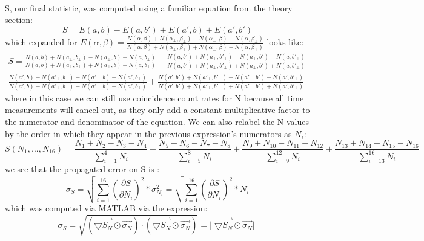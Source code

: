 \documentclass{article}
\begin{document}
    \\\indent S, our final statistic, was computed using a familiar equation from the theory section:
    \begin{equation}
        S = E(a,b) - E(a,b') + E(a',b) + E(a',b')
    \end{equation}
    which expanded for $E(\alpha,\beta) = \frac{N(\alpha,\beta) + N(\alpha_\bot,\beta_\bot) - N(\alpha_\bot,\beta) - N(\alpha,\beta_\bot)}{N(\alpha,\beta) + N(\alpha_\bot,\beta_\bot) + N(\alpha_\bot,\beta) + N(\alpha,\beta_\bot)}$ looks like:
    \begin{equation}
    \begin{array}{c}
        S = \frac{N(a,b) + N(a_\bot,b_\bot) - N(a_\bot,b) - N(a,b_\bot)}{N(a,b) + N(a_\bot,b_\bot) + N(a_\bot,b) + N(a,b_\bot)} - \frac{N(a,b') + N(a_\bot,b'_\bot) - N(a_\bot,b') - N(a,b'_\bot)}{N(a,b') + N(a_\bot,b'_\bot) + N(a_\bot,b') + N(a,b'_\bot)} + \\\frac{N(a',b) + N(a'_\bot,b_\bot) - N(a'_\bot,b) - N(a',b_\bot)}{N(a',b) + N(a'_\bot,b_\bot) + N(a'_\bot,b) + N(a',b_\bot)} + \frac{N(a',b') + N(a'_\bot,b'_\bot) - N(a'_\bot,b') - N(a',b'_\bot)}{N(a',b') + N(a'_\bot,b'_\bot) + N(a'_\bot,b') + N(a',b'_\bot)}
        \end{array}
    \end{equation}
    where in this case we can still use coincidence count rates for N because all time measurements will cancel out, as they only add a constant multiplicative factor to the numerator and denominator of the equation. We can also relabel the N-values by the order in which they appear in the previous expression's numerators as $N_i$:
    \begin{equation}
        S(N_1,...,N_{16}) = \frac{N_1 + N_2 - N_3 - N_4}{\sum_{i=1}^4 N_i} -\frac{N_5 + N_6 - N_7 - N_8}{\sum_{i=5}^8 N_i}  +\frac{N_9 + N_{10} - N_{11} - N_{12}}{\sum_{i=9}^{12} N_i} +\frac{N_{13} + N_{14} - N_{15} - N_{16}}{\sum_{i=13}^{16} N_i} 
    \end{equation}
    we see that the propagated error on S is \cite{deh}:
    \begin{equation}
        \sigma_S = \sqrt{\sum_{i=1}^{16} (\frac{\partial{S}}{\partial{N_i}})^2*\sigma_{N_i}^2} = \sqrt{\sum_{i=1}^{16} (\frac{\partial{S}}{\partial{N_i}})^2*N_i}
    \end{equation}
    which was computed via MATLAB via the expression:
    \begin{equation}
        \sigma_S = \sqrt{(\vec{\bigtriangledown S_N} \odot \vec{\sigma_N})\cdot (\vec{\bigtriangledown S_N} \odot \vec{\sigma_N})} = ||\vec{\bigtriangledown S_N} \odot \vec{\sigma_N}||
    \end{equation}
\end{document}
